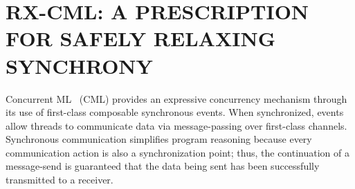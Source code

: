 \newcommand{\OExec}[3]{\langle #1, #2 \rangle_{#3}}
\newcommand{\ExecP}{\langle {\sf P}, \ActionSet,\po,\co \rangle}
\newcommand{\PrgState}[2]{\langle (t,E[#1]) \;\|\; \threadsoup,#2 \rangle}

\newcommand{\trace}{\mathit{tr}}
\newcommand{\commit}[2]{\epsilon_{(#1,#2)}}

\newcommand{\wf}[1]{{\sf WF}(#1)}
\newcommand{\transOpAx}[2]{\opax(#1,#2)}

\newcommand{\filtera}[2]{#1{\downarrow}_{#2}}

\newcommand{\thread}{\mathit{T}}
\newcommand{\threadid}{\textsf{t}}
\newcommand{\spawn}{\textsf{spawn}}
\newcommand{\unit}{\textsf{unit}}
\newcommand{\threadsoup}{\overline{\mathit{T}}}
\newcommand{\threadsoupp}{\overline{\mathit{T'}}}
\newcommand{\eval}[1]{\mathit{E}[#1]}
\newcommand{\evaln}{\mathit{E}}
\newcommand{\chan}{\textsf{ch}}
\newcommand{\send}{\textsf{send}}
\newcommand{\recv}{\textsf{recv}}
\newcommand{\join}{\textsf{join}}
\newcommand{\con}{\textsf{Con}}
\newcommand{\prev}{\textsf{Prev}}
\newcommand{\fresh}{\textsf{fresh}}
\newcommand{\print}{\textsf{print}}
\newcommand{\tupletwo}[2]{(#1,#2)}
\newcommand{\ALT}{~\mid~}
\newcommand{\ruleref}[1]{{\sc\small [#1]}}
\renewcommand{\bar}{\overline}

\newcommand{\opIntraState}[1]{E[#1]}
\newcommand{\readyOp}[1]{\R{\SCFN{Ready}}_{op}(#1)}
\newcommand{\doneOp}{\R{\SCFN{Done}}_{op}}
\newcommand{\localstate}{L}
\newcommand{\ProgramState}{\R{\SCFN{ProgState}}}
\newcommand{\opax}{{\cal T}^{\mbox{\tiny\sc op}}_{\mbox{\tiny\sc ax}}}
\newcommand{\opaxGen}{{\cal G}^{\mbox{\tiny\sc op}}_{\mbox{\tiny\sc ax}}}
\newcommand{\axcml}{\R{\SCFN{Ax$_2$Cml}}}




\chapter{RX-CML: A PRESCRIPTION FOR SAFELY RELAXING SYNCHRONY}
\label{chap:rxcml}

Concurrent ML~\cite{Reppy07} (CML) provides an expressive concurrency mechanism
through its use of first-class composable synchronous events.  When
synchronized, events allow threads to communicate data via message-passing over
first-class channels.  Synchronous communication simplifies program reasoning
because every communication action is also a synchronization point; thus, the
continuation of a message-send is guaranteed that the data being sent has been
successfully transmitted to a receiver.

